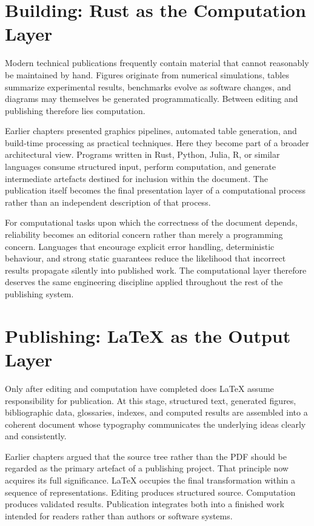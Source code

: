 \hypertarget{building-rust-as-the-computation-layer}{%
\section{Building: Rust as the Computation Layer}\label{building-rust-as-the-computation-layer}}

Modern technical publications frequently contain material that cannot reasonably be maintained by hand. Figures originate from numerical simulations, tables summarize experimental results, benchmarks evolve as software changes, and diagrams may themselves be generated programmatically. Between editing and publishing therefore lies computation.

Earlier chapters presented graphics pipelines, automated table generation, and build-time processing as practical techniques. Here they become part of a broader architectural view. Programs written in Rust, Python, Julia, R, or similar languages consume structured input, perform computation, and generate intermediate artefacts destined for inclusion within the document. The publication itself becomes the final presentation layer of a computational process rather than an independent description of that process.

For computational tasks upon which the correctness of the document depends, reliability becomes an editorial concern rather than merely a programming concern. Languages that encourage explicit error handling, deterministic behaviour, and strong static guarantees reduce the likelihood that incorrect results propagate silently into published work. The computational layer therefore deserves the same engineering discipline applied throughout the rest of the publishing system.

\hypertarget{publishing-latex-as-the-output-layer}{%
\section{Publishing: LaTeX as the Output Layer}\label{publishing-latex-as-the-output-layer}}

Only after editing and computation have completed does LaTeX assume responsibility for publication. At this stage, structured text, generated figures, bibliographic data, glossaries, indexes, and computed results are assembled into a coherent document whose typography communicates the underlying ideas clearly and consistently.

Earlier chapters argued that the source tree rather than the PDF should be regarded as the primary artefact of a publishing project. That principle now acquires its full significance. LaTeX occupies the final transformation within a sequence of representations. Editing produces structured source. Computation produces validated results. Publication integrates both into a finished work intended for readers rather than authors or software systems.

